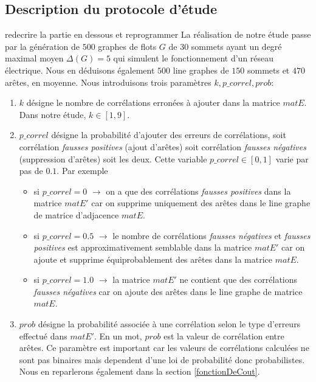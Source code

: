 \documentclass[onecolumn, 12pt]{book}
\begin{document}
\subsection{Description du protocole d'\'etude}
redecrire la partie en dessous et reprogrammer \newline
La r\'ealisation de notre \'etude passe par la g\'en\'eration de $500$ graphes de flots $G$ de $30$ sommets ayant un degr\'e maximal moyen $\Delta(G) = 5$ qui simulent le fonctionnement d'un r\'eseau \'electrique. Nous en d\'eduisons \'egalement $500$ line graphes de $150$ sommets et $470$ ar\^etes, en moyenne. \newline
Nous introduisons trois param\`etres $k, p\_correl, prob$:
\begin{enumerate}
\item $k$ d\'esigne le nombre de corr\'elations erron\'ees \`a ajouter dans la matrice $matE$. Dans notre \'etude, $k \in [1,9]$.
\item $p\_correl$ d\'esigne la probabilit\'e d'ajouter des erreurs de corr\'elations, soit corr\'elation {\em fausses positives} (ajout d'ar\^etes) soit corr\'elation {\em fausses n\'egatives} (suppression d'ar\^etes) soit les deux. Cette variable $p\_correl \in [0,1]$ varie par pas de $0.1$. Par exemple
	\begin{itemize}
	\item si $p\_correl=0$ $\rightarrow$ on a que des corr\'elations {\em fausses positives} dans la matrice $matE'$ car on supprime uniquement des ar\^etes dans le line graphe de matrice d'adjacence $matE$.
	\item si $p\_correl=0.5$ $\rightarrow$ le nombre de corr\'elations {\em fausses n\'egatives} et  {\em fausses positives} est approximativement semblable  dans la matrice $matE'$ car on ajoute et supprime \'equiprobablement des ar\^etes dans la matrice $matE$.
	\item si $p\_correl=1.0$ $\rightarrow$ la matrice $matE'$ ne contient que des corr\'elations {\em fausses n\'egatives} car on ajoute des ar\^etes dans le line graphe de matrice $matE$.
	\end{itemize}
\item $prob$ d\'esigne la probabilit\'e associ\'ee \`a une corr\'elation selon le type d'erreurs effectu\'e dans $matE'$. En un mot, $prob$ est la valeur de corr\'elation entre ar\^etes.
Ce param\`etre est important car les valeurs de corr\'elations calcul\'ees  ne sont pas binaires mais dependent d'une loi de probabilit\'e donc probabilistes. Nous en reparlerons \'egalement dans la section \ref{fonctionDeCout}.
\end{enumerate}
\end{document}
